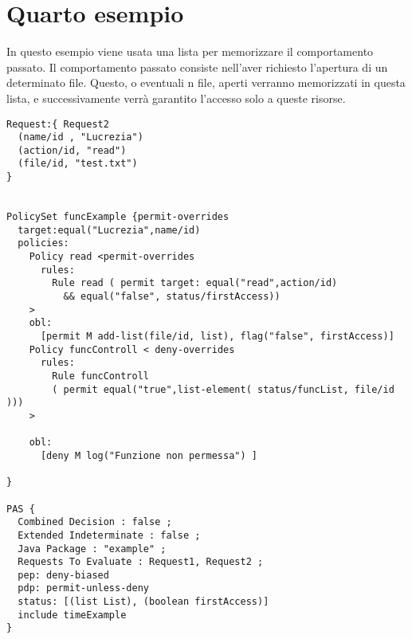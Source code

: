 \documentclass[a4paper, 10pt]{article}
\begin{document}
\section{Quarto esempio} %
\label{sec:quarto_esempio}
In questo esempio viene usata una lista per memorizzare il comportamento passato.
Il comportamento passato consiste nell'aver richiesto l'apertura di un determinato file.
Questo, o eventuali n file, aperti verranno memorizzati in questa lista, e successivamente verrà garantito l'accesso  solo a queste risorse.

	
\begin{verbatim}
Request:{ Request2 
  (name/id , "Lucrezia")
  (action/id, "read")
  (file/id, "test.txt")
}


PolicySet funcExample {permit-overrides 
  target:equal("Lucrezia",name/id)   
  policies: 
    Policy read <permit-overrides
      rules:
        Rule read ( permit target: equal("read",action/id) 
          && equal("false", status/firstAccess))
    >
    obl:
      [permit M add-list(file/id, list), flag("false", firstAccess)]
    Policy funcControll < deny-overrides  
      rules: 
        Rule funcControll 
        ( permit equal("true",list-element( status/funcList, file/id )))
    >
    
    obl: 
      [deny M log("Funzione non permessa") ]

}

PAS { 
  Combined Decision : false ;
  Extended Indeterminate : false ;
  Java Package : "example" ;
  Requests To Evaluate : Request1, Request2 ;
  pep: deny-biased
  pdp: permit-unless-deny
  status: [(list List), (boolean firstAccess)]
  include timeExample
}
	\end{verbatim}
\end{document}
